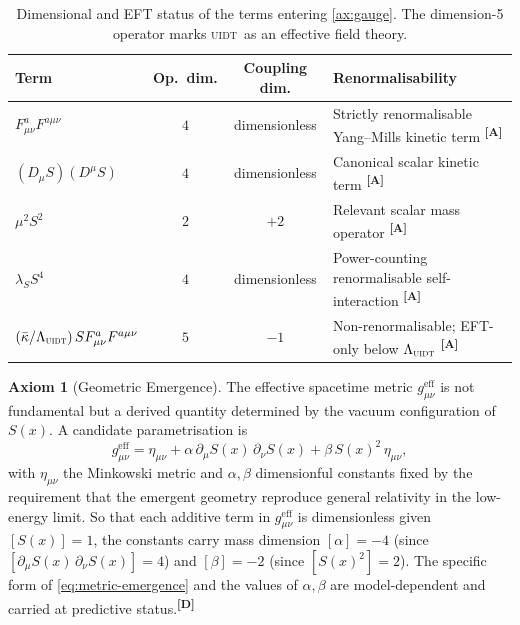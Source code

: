 \documentclass[12pt,a4paper,twoside]{article}
\theoremstyle{plain}
\theoremstyle{definition}
\newtheorem{axiom}{Axiom}
\theoremstyle{remark}
\newcommand{\UIDT}{\textsc{uidt}}
\newcommand{\catmark}[1]{\textsuperscript{\textsf{\textbf{[#1]}}}}
\newcommand{\Sx}{S(x)}
\begin{document}
\begin{table}[H]
\centering
\scriptsize
\caption{Dimensional and EFT status of the terms entering \cref{ax:gauge}.
The dimension-5 operator marks \UIDT\ as an effective field theory.}
\label{tab:eft-dimensions}
\renewcommand{\arraystretch}{1.25}
\begin{tabular}{p{} c c p{}}
\toprule
\textbf{Term} & \textbf{Op.\ dim.} & \textbf{Coupling dim.} & \textbf{Renormalisability} \\
\midrule
$F_{\mu\nu}^a F^{a\mu\nu}$ & $4$ & dimensionless & Strictly renormalisable Yang--Mills kinetic term \catmark{A} \\
$(D_\mu S)(D^\mu S)$ & $4$ & dimensionless & Canonical scalar kinetic term \catmark{A} \\
$\mu^2 S^2$ & $2$ & $+2$ & Relevant scalar mass operator \catmark{A} \\
$\lambda_S S^4$ & $4$ & dimensionless & Power-counting renormalisable self-interaction \catmark{A} \\
$(\bar\kappa/\Lambda_{\UIDT})\,S F_{\mu\nu}^a F^{a\mu\nu}$ & $5$ & $-1$ & Non-renormalisable; EFT-only below $\Lambda_{\UIDT}$ \catmark{A} \\
\bottomrule
\end{tabular}
\end{table}

\begin{axiom}[Geometric Emergence]
\label{ax:emergence}
The effective spacetime metric $g_{\mu\nu}^{\mathrm{eff}}$ is not fundamental but a derived quantity determined by the vacuum configuration of $\Sx$. A candidate parametrisation is
\begin{equation}
 g_{\mu\nu}^{\mathrm{eff}} = \eta_{\mu\nu}
 + \alpha\,\partial_\mu\Sx\,\partial_\nu\Sx
 + \beta\,\Sx^2\,\eta_{\mu\nu},
 \label{eq:metric-emergence}
\end{equation}
with $\eta_{\mu\nu}$ the Minkowski metric and $\alpha,\beta$ dimensionful constants fixed by the requirement that the emergent geometry reproduce general relativity in the low-energy limit. So that each additive term in $g_{\mu\nu}^{\mathrm{eff}}$ is dimensionless given $[\Sx]=1$, the constants carry mass dimension $[\alpha]=-4$ (since $[\partial_\mu\Sx\,\partial_\nu\Sx]=4$) and $[\beta]=-2$ (since $[\Sx^2]=2$). The specific form of \cref{eq:metric-emergence} and the values of $\alpha,\beta$ are model-dependent and carried at predictive status.\catmark{D}
\end{axiom}
\end{document}

